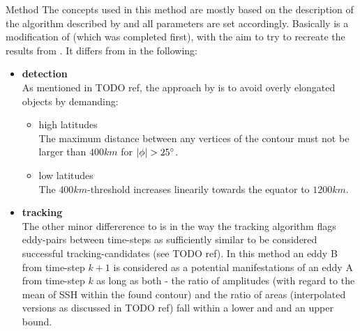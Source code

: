 

\newpage
{}
\begin{cbox}{Method \MI}\label{box:MI}
The concepts used in this method are mostly based on the description of the algorithm described by \citet{Chelton2011} and all parameters are set accordingly. Basically \MI is a modification of \MII (which was completed first), with the aim to try to recreate the results from \citep{Chelton2011}.
It differs from \MII in the following:
\begin{itemize}
	\item \textbf{detection}\\
As mentioned in TODO ref, the approach by \citet{Chelton2011} is to avoid overly elongated objects by demanding:
\begin{itemize}
	\item high latitudes\\
	The maximum distance between any vertices of the contour must not be larger than $400km$ for $\abs{\phi}>\deg{25}$.
	\item low latitudes\\
The $400km$-threshold increases linearily towards the equator to $1200km$.
\end{itemize}
	\item \textbf{tracking}\\
The other minor differerence to \MII is in the way the tracking algorithm flags eddy-pairs between time-steps as sufficiently similar to be considered successful tracking-candidates (see TODO ref).
In this method an eddy B from time-step $k+1$ is considered as a potential manifestations of an eddy A from time-step $k$ as long as both - the ratio of amplitudes (with regard to the mean of SSH within the found contour) and the ratio of areas (interpolated versions as discussed in TODO ref) fall within a lower and and an upper bound.
\end{itemize}
\end{cbox}



